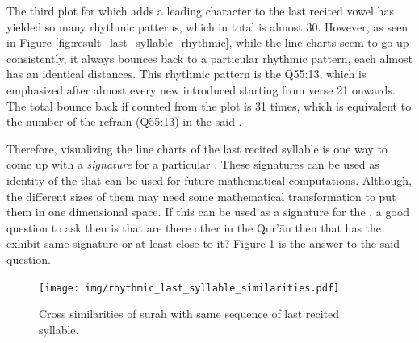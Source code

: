 The third plot for   which adds a leading character to the last recited vowel has yielded so many rhythmic patterns, which in total is almost 30. However, as seen in Figure \ref{fig:result_last_syllable_rhythmic}, while the line charts seem to go up consistently, it always bounces back to a particular rhythmic pattern, each almost has an identical distances. This rhythmic pattern is the Q55:13, which is emphasized after almost every new   introduced starting from verse 21 onwards. The total bounce back if counted from the plot is 31 times, which is equivalent to the number of the refrain (Q55:13) in the said  . 

Therefore, visualizing the line charts of the last recited syllable is one way to come up with a \textit{signature} for a particular  . These signatures can be used as identity of the   that can be used for future mathematical computations. Although, the different sizes of them may need some mathematical transformation to put them in one dimensional space. If this can be used as a signature for the  , a good question to ask then is that are there other   in the Qur'\=an then that has the exhibit same signature or at least close to it? Figure \ref{fig:result_last_syllable_rhythmic_cross_similarities} is the answer to the said question.

\begin{figure}[!t]
    \centering
    \texttt{[image: img/rhythmic\_last\_syllable\_similarities.pdf]}
    \caption{Cross similarities of surah with same sequence of last recited syllable.}
    \label{fig:result_last_syllable_rhythmic_cross_similarities}
\end{figure}

